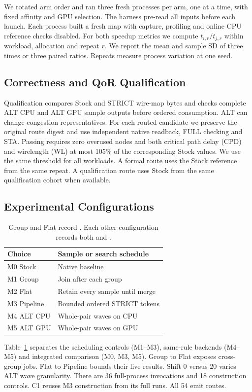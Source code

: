 We rotated arm order and ran three fresh processes per arm, one at a time, with fixed affinity and GPU selection. The harness pre-read all inputs before each launch. Each process built a fresh map with capture, profiling and online CPU reference checks disabled. For both speedup metrics we compute $t_{i,r}/t_{j,r}$ within workload, allocation and repeat $r$. We report the mean and sample SD of three times or three paired ratios. Repeats measure process variation at one seed.
\subsection{Correctness and QoR Qualification}
Qualification compares Stock and STRICT wire-map bytes and checks complete ALT CPU and ALT GPU sample outputs before ordered consumption. ALT can change congestion representatives. For each routed candidate we preserve the original route digest and use independent native readback, FULL checking and STA. Passing requires zero overused nodes and both critical path delay (CPD) and wirelength (WL) at most 105\% of the corresponding Stock values. We use the same threshold for all workloads. A formal route uses the Stock reference from the same repeat. A qualification route uses Stock from the same qualification cohort when available.
\subsection{Experimental Configurations}
\begin{table}[t]\centering
\caption{Group and Flat record \constructiontime{}. Each other configuration records both \constructiontime{} and \processtime{}.}\label{tab:configs}
\begin{tabular}{ll}\toprule Choice & Sample or search schedule\\\midrule
M0 Stock & Native baseline\\
M1 Group & Join after each group\\
M2 Flat & Retain every sample until merge\\
M3 Pipeline & Bounded ordered STRICT tokens\\
M4 ALT CPU & Whole-pair waves on CPU\\
M5 ALT GPU & Whole-pair waves on GPU\\\bottomrule\end{tabular}\end{table}
Table~\ref{tab:configs} separates the scheduling controls (M1--M3), same-rule backends (M4--M5) and integrated comparison (M0, M3, M5). Group to Flat exposes cross-group jobs. Flat to Pipeline bounds their live results. Shift 0 versus 20 varies ALT wave granularity. There are 36 full-process invocations and 18 construction controls. C1 reuses M3 construction from its full runs. All 54 emit routes.
